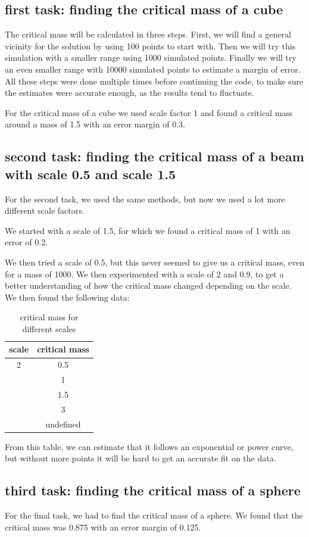 \subsection{first task: finding the critical mass of a cube}
The critical mass will be calculated in three steps. First, we will find a general vicinity for the solution by using 100 points to start with. Then we will try this simulation with a smaller range using 1000 simulated points. Finally we will try an even smaller range with 10000 simulated points to estimate a margin of error. All these steps were done multiple times before continuing the code, to make sure the estimates were accurate enough, as the results tend to fluctuate.

For the critical mass of a cube we used scale factor 1 and found a critical mass around a mass of 1.5 with an error margin of 0.3.
\subsection{second task: finding the critical mass of a beam with scale 0.5 and scale 1.5}
For the second task, we used the same methods, but now we used a lot more different scale factors.

We started with a scale of 1.5, for which we found a critical mass of 1 with an error of 0.2.

We then tried a scale of 0.5, but this never seemed to give us a critical mass, even for a mass of 1000. We then experimented with a scale of 2 and 0.9, to get a better understanding of how the critical mass changed depending on the scale. We then found the following data:
\begin{table}[H]
	\centering
	\begin{tabular}{|c|c|}
		\hline
		scale & critical mass \\ \hline\hline
		2 & 0.5 \\ \hdashline
		1.5 & 1 \\ \hdashline
		1 & 1.5 \\ \hdashline
		0.9 & 3 \\ \hdashline
		0.5 & undefined \\ \hline
	\end{tabular}
	\caption{critical mass for different scales}
\end{table}
From this table, we can estimate that it follows an exponential or power curve, but without more points it will be hard to get an accurate fit on the data.
\subsection{third task: finding the critical mass of a sphere}
For the final task, we had to find the critical mass of a sphere. We found that the critical mass was 0.875 with an error margin of 0.125.
\pagebreak